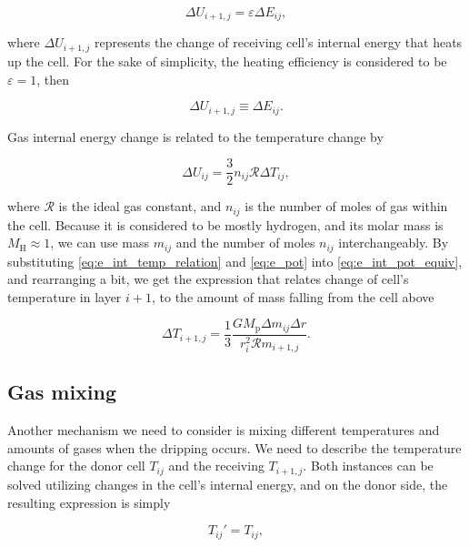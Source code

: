 \begin{equation}
	\Delta U_{i+1,j} = \varepsilon \Delta E_{ij},
\end{equation}

where $\Delta U_{i+1,j}$ represents the change of receiving cell's internal energy that heats up the cell. For the sake of simplicity, the heating efficiency is considered to be ${\varepsilon=1}$, then  

\begin{equation}
	\Delta U_{i+1,j} \equiv \Delta E_{ij}.
	\label{eq:e_int_pot_equiv}
\end{equation} 

Gas internal energy change is related to the temperature change by

\begin{equation}
	\Delta U_{ij} = \frac{3}{2} n_{ij} \mathcal{R} \Delta T_{ij},
	\label{eq:e_int_temp_relation}
\end{equation}

where $\mathcal{R}$ is the ideal gas constant, and $n_{ij}$ is the number of moles of gas within the cell. Because it is considered to be mostly hydrogen, and its molar mass is $M_{\text{H}} \approx 1$, we can use mass $m_{ij}$ and the number of moles $n_{ij}$ interchangeably. By substituting \eqref{eq:e_int_temp_relation} and \eqref{eq:e_pot} into \eqref{eq:e_int_pot_equiv}, and rearranging a bit, we get the expression that relates change of cell's temperature in layer $i+1$, to the amount of mass falling from the cell above

\begin{equation}
	\Delta T_{i+1,j} = \frac{1}{3} \frac{G M_{\text{p}} \Delta m_{ij} \Delta r}{r_{i}^2 \mathcal{R} m_{i+1,j}}.
	\label{eq:temp_ff_final}
\end{equation}

\subsection{Gas mixing}

Another mechanism we need to consider is mixing different temperatures and amounts of gases when the dripping occurs. We need to describe the temperature change for the donor cell $T_{ij}$ and the receiving $T_{i+1,j}$. Both instances can be solved utilizing changes in the cell's internal energy, and on the donor side, the resulting expression is simply  

\begin{equation}
T_{ij}' = T_{ij},
\end{equation}

